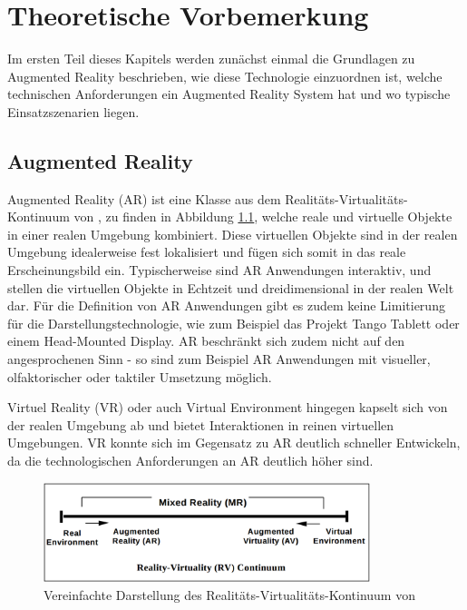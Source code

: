 \chapter{Theoretische Vorbemerkung}

Im ersten Teil dieses Kapitels werden zunächst einmal die Grundlagen zu Augmented Reality beschrieben, wie diese Technologie einzuordnen ist, welche technischen Anforderungen ein Augmented Reality System hat und wo typische Einsatzszenarien liegen.

\section{Augmented Reality}

Augmented Reality (AR) ist eine Klasse aus dem Realitäts-Virtualitäts-Kontinuum von \cite{milgram1995augmented}, zu finden in Abbildung \ref{fig:virtual-continuum}, welche reale und virtuelle Objekte in einer realen Umgebung kombiniert. Diese virtuellen Objekte sind in der realen Umgebung idealerweise fest lokalisiert und fügen sich somit in das reale Erscheinungsbild ein. Typischerweise sind AR Anwendungen interaktiv, und stellen die virtuellen Objekte in Echtzeit und dreidimensional in der realen Welt dar. Für die Definition von AR Anwendungen gibt es zudem keine Limitierung für die Darstellungstechnologie, wie zum Beispiel das Projekt Tango Tablett oder einem Head-Mounted Display. AR beschränkt sich zudem nicht auf den angesprochenen Sinn - so sind zum Beispiel AR Anwendungen mit visueller, olfaktorischer oder taktiler Umsetzung möglich. 

Virtuel Reality (VR) oder auch Virtual Environment hingegen kapselt sich von der realen Umgebung ab und bietet Interaktionen in reinen virtuellen Umgebungen. VR konnte sich im Gegensatz zu AR deutlich schneller Entwickeln, da die technologischen Anforderungen an AR deutlich höher sind. \citep{van2010survey}


\begin{figure}
  \centering
	\includegraphics[width=0.85\textwidth]{content/images/virtual-continuum.png} 
  \caption{Vereinfachte Darstellung des Realitäts-Virtualitäts-Kontinuum von \citet*{milgram1995augmented}}
  \label{fig:virtual-continuum}
\end{figure}

